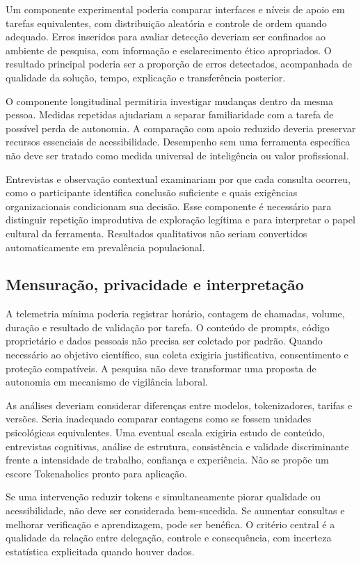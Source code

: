 \documentclass[11pt,a4paper]{article}
\begin{document}
Um componente experimental poderia comparar interfaces e níveis de apoio em tarefas equivalentes, com distribuição aleatória e controle de ordem quando adequado. Erros inseridos para avaliar detecção deveriam ser confinados ao ambiente de pesquisa, com informação e esclarecimento ético apropriados. O resultado principal poderia ser a proporção de erros detectados, acompanhada de qualidade da solução, tempo, explicação e transferência posterior.

O componente longitudinal permitiria investigar mudanças dentro da mesma pessoa. Medidas repetidas ajudariam a separar familiaridade com a tarefa de possível perda de autonomia. A comparação com apoio reduzido deveria preservar recursos essenciais de acessibilidade. Desempenho sem uma ferramenta específica não deve ser tratado como medida universal de inteligência ou valor profissional.

Entrevistas e observação contextual examinariam por que cada consulta ocorreu, como o participante identifica conclusão suficiente e quais exigências organizacionais condicionam sua decisão. Esse componente é necessário para distinguir repetição improdutiva de exploração legítima e para interpretar o papel cultural da ferramenta. Resultados qualitativos não seriam convertidos automaticamente em prevalência populacional.

\subsection{Mensuração, privacidade e interpretação}
A telemetria mínima poderia registrar horário, contagem de chamadas, volume, duração e resultado de validação por tarefa. O conteúdo de prompts, código proprietário e dados pessoais não precisa ser coletado por padrão. Quando necessário ao objetivo científico, sua coleta exigiria justificativa, consentimento e proteção compatíveis. A pesquisa não deve transformar uma proposta de autonomia em mecanismo de vigilância laboral.

As análises deveriam considerar diferenças entre modelos, tokenizadores, tarifas e versões. Seria inadequado comparar contagens como se fossem unidades psicológicas equivalentes. Uma eventual escala exigiria estudo de conteúdo, entrevistas cognitivas, análise de estrutura, consistência e validade discriminante frente a intensidade de trabalho, confiança e experiência. Não se propõe um escore Tokenaholics pronto para aplicação.

Se uma intervenção reduzir tokens e simultaneamente piorar qualidade ou acessibilidade, não deve ser considerada bem-sucedida. Se aumentar consultas e melhorar verificação e aprendizagem, pode ser benéfica. O critério central é a qualidade da relação entre delegação, controle e consequência, com incerteza estatística explicitada quando houver dados.
\end{document}
